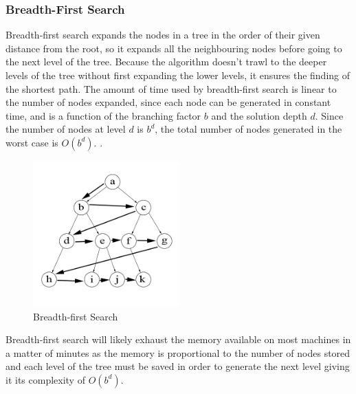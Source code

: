 \documentclass[review]{cmpreport}
\begin{document}
\subsubsection{Breadth-First Search}
Breadth-first search expands the nodes in a tree in the order of their given distance from the root, so it expands all the neighbouring nodes before going to the next level of the tree. Because the algorithm doesn't trawl to the deeper levels of the tree without first expanding the lower levels, it ensures the finding of the shortest path. The amount of time used by breadth-first search is linear to the number of nodes expanded, since each node can be generated in constant time, and is a function of the branching factor $b$ and the solution depth $d$. Since the number of nodes at level $d$ is $b^d$, the total number of nodes generated in the worst case is $O(b^d)$. \citep{DBLP:journals/mima/Korf95}.

\begin{figure}[ht]
	\centering
	\includegraphics[width=0.5\textwidth]{breadth_first}
	\captionsetup{justification=centering}
	\caption{Breadth-first Search}
\end{figure}
Breadth-first search will likely exhaust the memory available on most machines in a matter of minutes as the memory is proportional to the number of nodes stored and each level of the tree must be saved in order to generate the next level giving it its complexity of $O(b^d)$.
\end{document}

